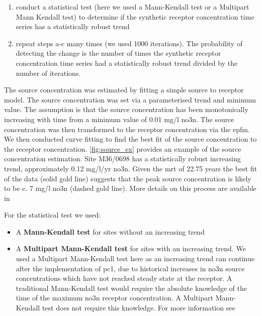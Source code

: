 \begin{enumerate}
\begin{enumerate}
        \item conduct a statistical test (here we used a Mann-Kendall test or a Multipart Mann Kendall test) to determine if the synthetic receptor concentration time series has a statistically robust trend
        \item repeat steps a-c many times (we used 1000 iterations). The probability of detecting the change is the number of times the synthetic receptor concentration time series had a statistically robust trend divided by the number of iterations.
    \end{enumerate}
\end{enumerate}

The source concentration was estimated by fitting a simple source to receptor model.
The source concentration was set via a parameterised trend and minimum value.
The assumption is that the source concentration has been monotonically increasing with time from a minimum value of 0.01 mg/l \gls{no3n}.
The source concentration was then transformed to the receptor concentration via the \gls{epfm}.
We then conducted curve fitting to find the best fit of the source concentration to the receptor concentration.
\autoref{fig:source_ex} provides an example of the source concentration estimation.
Site M36/0698 has a statistically robust increasing trend, approximately 0.12 mg/l/yr \gls{no3n}.
Given the \gls{mrt} of 22.75 years the best fit of the data (solid gold line) suggests that the peak source concentration is likely to be c. 7 mg/l \gls{no3n} (dashed gold line).
More details on this process are available in \citet{dumont_determining_nodate, dumont_komanawagw_age_tools_2023}


For the statistical test we used:
\begin{itemize}
    \item A \textbf{Mann-Kendall test} for sites without an increasing trend
    \item A \textbf{Multipart Mann-Kendall test} for sites with an increasing trend. We used a Multipart Mann-Kendall test here as an increasing trend can continue after the implementation of \gls{pc1}, due to historical increases in \gls{no3n} source concentrations which have not reached steady state at the receptor. A traditional Mann-Kendall test would require the absolute knowledge of the time of the maximum \gls{no3n} receptor concentration. A Multipart Mann-Kendall test does not require this knowledge. For more information see \citet{dumont_komanawakendall_stats_2023}
\end{itemize}

